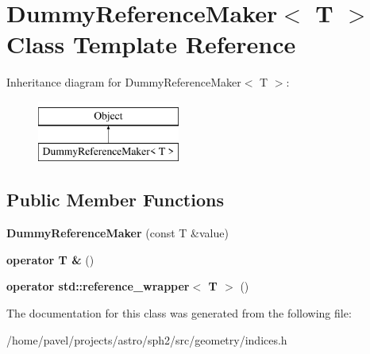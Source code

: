 \hypertarget{classDummyReferenceMaker}{}\section{Dummy\+Reference\+Maker$<$ T $>$ Class Template Reference}
\label{classDummyReferenceMaker}
Inheritance diagram for Dummy\+Reference\+Maker$<$ T $>$\+:\begin{figure}[H]
\begin{center}
\leavevmode
\includegraphics[height=2.000000cm]{classDummyReferenceMaker}
\end{center}
\end{figure}
\subsection*{Public Member Functions}
\begin{DoxyCompactItemize}
\item 
\hypertarget{classDummyReferenceMaker_a59727e1d1163a8b9ebb5656876a334c5}{}\label{classDummyReferenceMaker_a59727e1d1163a8b9ebb5656876a334c5} 
{\bfseries Dummy\+Reference\+Maker} (const T \&value)
\item 
\hypertarget{classDummyReferenceMaker_a918fa903ab4c1be5cf8195aa6d2ad7fc}{}\label{classDummyReferenceMaker_a918fa903ab4c1be5cf8195aa6d2ad7fc} 
{\bfseries operator T \&} ()
\item 
\hypertarget{classDummyReferenceMaker_a20e7ebcf7570c180e2d70fca01cc7392}{}\label{classDummyReferenceMaker_a20e7ebcf7570c180e2d70fca01cc7392} 
{\bfseries operator std\+::reference\+\_\+wrapper$<$ T $>$} ()
\end{DoxyCompactItemize}


The documentation for this class was generated from the following file\+:\begin{DoxyCompactItemize}
\item 
/home/pavel/projects/astro/sph2/src/geometry/indices.\+h\end{DoxyCompactItemize}
